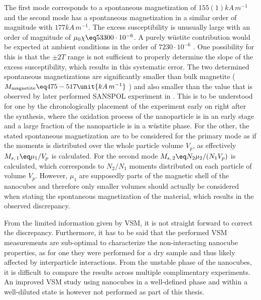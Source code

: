 \documentclass[\main/dresen_thesis.tex]{subfiles}
\begin{document}
  The first mode corresponds to a spontaneous magnetization of $155(1) \unit{kA \, m^{-1}}$ and the second mode has a spontaneous magnetization in a similar order of magnitude with $177 \unit{kA \, m^{-1}}$.
  The excess susceptibility is unusually large with an order of magnitude of $\mu_0 \chi \eq 53300 \cdot 10^{-6}$.
  A purely w\"ustite contribution would be expected at ambient conditions in the order of $7230 \cdot 10^{-6}$ \cite{Lide_2004_Handb}.
  One possibility for this is that the $\pm 2 \unit{T}$ range is not sufficient to properly determine the slope of the excess susceptibility, which results in this systematic error.
  The two determined spontaneous magnetizations are significantly smaller than bulk magnetite ($M_\mathrm{magnetite} \eq 475 - 517 \unit{kA \, m^{-1}}$ \cite{Cornell_2003_Their, Handley_2000_Moder}) and also smaller than the value that is observed by later performed SANSPOL experiment in .
  This is to be understood for one by the chronologically placement of the experiment early on right after the synthesis, where the oxidation process of the nanoparticle is in an early stage and a large fraction of the nanoparticle is in a w\"ustite phase.
  For the other, the stated spontaneous magnetization are to be considered for the primary mode as if the moments is distributed over the whole particle volume $V_p$, as effectively $M_{s,\,1} \eq \mu_1 / V_p$ is calculated.
  For the second mode $M_{s,\,2} \eq N_2 \mu_2 / (N_1 V_p)$ is calculated, which corresponds to $N_2/N_1$ moments distributed on each particle of volume $V_p$.
  However, $\mu_1$ are supposedly parts of the magnetic shell of the nanocubes and therefore only smaller volumes should actually be considered when stating the spontaneous magnetization of the material, which results in the observed discrepancy.

  From the limited information given by VSM, it is not straight forward to correct the discrepancy.
  Furthermore, it has to be said that the performed VSM measurements are sub-optimal to characterize the non-interacting nanocube properties, as for one they were performed for a dry sample and thus likely affected by interparticle interactions.
  From the unstable phase of the nanocubes, it is difficult to compare the results across multiple complimentary experiments.
  An improved VSM study using nanocubes in a well-defined phase and within a well-diluted state is however not performed as part of this thesis.
\end{document}

